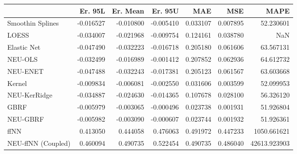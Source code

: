 \begin{tabular}{lrrrrrr}
\toprule
{} &   Er. 95L &  Er. Mean &   Er. 95U &       MAE &       MSE &          MAPE \\
\midrule
Smoothin Splines   & -0.016527 & -0.010800 & -0.005410 &  0.033107 &  0.007895 &     52.230601 \\
LOESS              & -0.034007 & -0.021968 & -0.009754 &  0.124161 &  0.038780 &           NaN \\
Elastic Net        & -0.047490 & -0.032223 & -0.016718 &  0.205180 &  0.061606 &     63.567131 \\
NEU-OLS            & -0.032499 & -0.016989 & -0.001412 &  0.207852 &  0.062936 &     64.612732 \\
NEU-ENET           & -0.047488 & -0.032243 & -0.017381 &  0.205123 &  0.061567 &     63.603668 \\
Kernel             & -0.009834 & -0.006081 & -0.002550 &  0.031606 &  0.003599 &     52.099953 \\
NEU-KerRidge       & -0.034887 & -0.024630 & -0.014365 &  0.107678 &  0.028100 &     56.326120 \\
GBRF               & -0.005979 & -0.003065 & -0.000496 &  0.023738 &  0.001931 &     51.926804 \\
NEU-GBRF           & -0.005982 & -0.003090 & -0.000607 &  0.023744 &  0.001932 &     51.926361 \\
ffNN               &  0.413050 &  0.444058 &  0.476063 &  0.491972 &  0.447233 &   1050.661621 \\
NEU-ffNN (Coupled) &  0.460094 &  0.490735 &  0.522454 &  0.490735 &  0.486040 &  42613.923903 \\
\bottomrule
\end{tabular}
